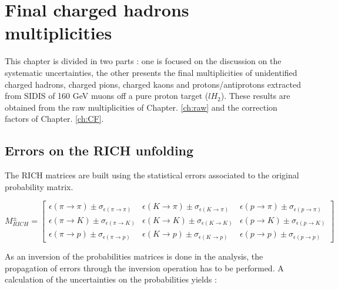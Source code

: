 
\chapter{Final charged hadrons multiplicities} %

\label{ch:mult} %


This chapter is divided in two parts : one is focused on the discussion on the systematic uncertainties, the other presents the final multiplicities of unidentified charged hadrons, charged pions, charged kaons and protons/antiprotons extracted from SIDIS of 160 GeV muons off a pure proton target ($lH_2$). These results are obtained from the raw multiplicities of Chapter. \ref{ch:raw} and the correction factors of Chapter. \ref{ch:CF}.

\section{Errors on the RICH unfolding}

The RICH matrices are built using the statistical errors associated to the original probability matrix.

\begin{equation}
M^{\pm}_{RICH}
=
\begin{bmatrix}
\epsilon(\pi \rightarrow \pi)\pm\sigma_{\epsilon(\pi \rightarrow \pi)} & \epsilon(K \rightarrow \pi)\pm\sigma_{\epsilon(K \rightarrow \pi)} & \epsilon(p \rightarrow \pi)\pm\sigma_{\epsilon(p \rightarrow \pi)}\\
\epsilon(\pi \rightarrow K)\pm\sigma_{\epsilon(\pi \rightarrow K)} & \epsilon(K \rightarrow K)\pm\sigma_{\epsilon(K \rightarrow K)} & \epsilon(p \rightarrow K)\pm\sigma_{\epsilon(p \rightarrow K)} \\
\epsilon(\pi \rightarrow p)\pm\sigma_{\epsilon(\pi \rightarrow p)} & \epsilon(K \rightarrow p)\pm\sigma_{\epsilon(K \rightarrow p)} & \epsilon(p \rightarrow p)\pm\sigma_{\epsilon(p \rightarrow p)}
\end{bmatrix}
\end{equation}

As an inversion of the probabilities matrices is done in the analysis, the propagation of errors through the
inversion operation has to be performed. A calculation of the uncertainties on the probabilities yields \cite{} :

